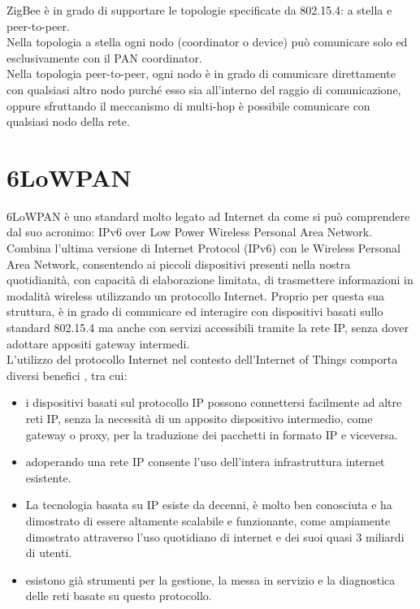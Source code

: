 \noindent ZigBee è in grado di supportare le topologie specificate da 802.15.4: a stella e peer-to-peer.\\
Nella topologia a stella ogni nodo (coordinator o device) può comunicare solo ed esclusivamente con il PAN coordinator.\\
Nella topologia peer-to-peer, ogni nodo è in grado di comunicare direttamente con qualsiasi altro nodo purché esso sia all'interno del raggio di comunicazione, oppure sfruttando il meccanismo di multi-hop è possibile comunicare con qualsiasi nodo della rete.

\section{6LoWPAN}
6LoWPAN è uno standard molto legato ad Internet da come si può comprendere dal suo acronimo: IPv6 over Low Power Wireless Personal Area Network. Combina l'ultima versione di Internet Protocol (IPv6) con le Wireless Personal Area Network, consentendo ai piccoli dispositivi presenti nella nostra quotidianità, con capacità di elaborazione limitata, di trasmettere informazioni in modalità wireless utilizzando un protocollo Internet. Proprio per questa sua struttura, è in grado di comunicare ed interagire con dispositivi basati sullo standard 802.15.4 ma anche con servizi accessibili tramite la rete IP, senza dover adottare appositi gateway intermedi.\\

\noindent L'utilizzo del protocollo Internet nel contesto dell'Internet of Things comporta diversi benefici \cite{shelby20116lowpan}, tra cui:
\begin{itemize}
    \item i dispositivi basati sul protocollo IP possono connettersi facilmente ad altre reti IP, senza la necessità di un apposito dispositivo intermedio, come gateway o proxy, per la traduzione dei pacchetti in formato IP e viceversa.
    \item adoperando una rete IP consente l'uso dell'intera infrastruttura internet esistente. 
    \item La tecnologia basata su IP esiste da decenni, è molto ben conosciuta e ha dimostrato di essere altamente scalabile e funzionante, come ampiamente dimostrato attraverso l'uso quotidiano di internet e dei suoi quasi 3 miliardi di utenti.
    \item esistono già strumenti per la gestione, la messa in servizio e la diagnostica delle reti basate su questo protocollo.
\end{itemize}

